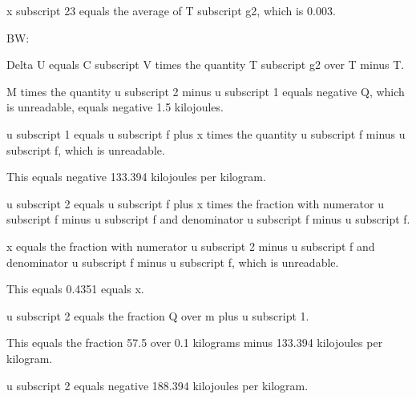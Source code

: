 x subscript 23 equals the average of T subscript g2, which is 0.003.

BW:

Delta U equals C subscript V times the quantity T subscript g2 over T minus T.

M times the quantity u subscript 2 minus u subscript 1 equals negative Q, which is unreadable, equals negative 1.5 kilojoules.

u subscript 1 equals u subscript f plus x times the quantity u subscript f minus u subscript f, which is unreadable.

This equals negative 133.394 kilojoules per kilogram.

u subscript 2 equals u subscript f plus x times the fraction with numerator u subscript f minus u subscript f and denominator u subscript f minus u subscript f.

x equals the fraction with numerator u subscript 2 minus u subscript f and denominator u subscript f minus u subscript f, which is unreadable.

This equals 0.4351 equals x.

u subscript 2 equals the fraction Q over m plus u subscript 1.

This equals the fraction 57.5 over 0.1 kilograms minus 133.394 kilojoules per kilogram.

u subscript 2 equals negative 188.394 kilojoules per kilogram.